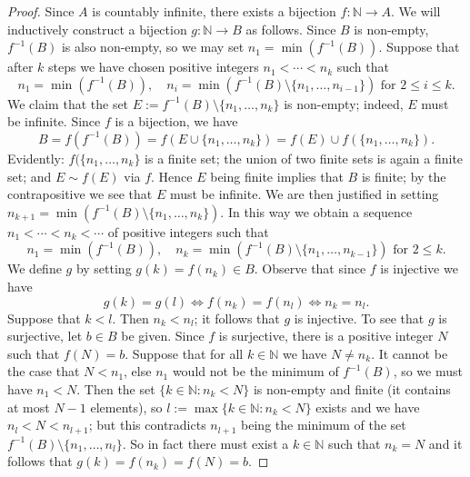 \documentclass[12pt]{article}
\theoremstyle{definition}
\begin{document}
\begin{proof}
    Since \( A \) is countably infinite, there exists a bijection \( f : \mathbb{N} \to A \). We will inductively construct a bijection \( g : \mathbb{N} \to B \) as follows. Since \( B \) is non-empty, \( f^{-1}(B) \) is also non-empty, so we may set \( n_1 = \min( f^{-1}(B)) \). Suppose that after \( k \) steps we have chosen positive integers \( n_1 < \cdots < n_k \) such that
    \[
        n_1 = \min(f^{-1}(B)), \quad n_i = \min(f^{-1}(B) \setminus \{ n_1, \ldots, n_{i-1} \}) \text{ for } 2 \leq i \leq k.
    \]
    We claim that the set \( E := f^{-1}(B) \setminus \{ n_1, \ldots, n_k \} \) is non-empty; indeed, \( E \) must be infinite. Since \( f \) is a bijection, we have
    \[
        B = f(f^{-1}(B)) = f(E \cup \{ n_1, \ldots, n_k \}) = f(E) \cup f(\{n_1, \ldots, n_k\}).
    \]
    Evidently: \( f(\{n_1, \ldots, n_k\} \) is a finite set; the union of two finite sets is again a finite set; and \( E \sim f(E) \) via \( f \). Hence \( E \) being finite implies that \( B \) is finite; by the contrapositive we see that \( E \) must be infinite. We are then justified in setting \( n_{k+1} = \min( f^{-1}(B) \setminus \{ n_1, \ldots, n_k \} ) \). In this way we obtain a sequence \( n_1 < \cdots < n_k < \cdots \) of positive integers such that
    \[
        n_1 = \min(f^{-1}(B)), \quad n_k = \min(f^{-1}(B) \setminus \{ n_1, \ldots, n_{k-1} \}) \text{ for } 2 \leq k.
    \]
    We define \( g \) by setting \( g(k) = f(n_k) \in B \). Observe that since \( f \) is injective we have
    \[
        g(k) = g(l) \iff f(n_k) = f(n_l) \iff n_k = n_l.
    \]
    Suppose that \( k < l \). Then \( n_k < n_l \); it follows that \( g \) is injective. To see that \( g \) is surjective, let \( b \in B \) be given. Since \( f \) is surjective, there is a positive integer \( N \) such that \( f(N) = b \). Suppose that for all \( k \in \mathbb{N} \) we have \( N \neq n_k \). It cannot be the case that \( N < n_1 \), else \( n_1 \) would not be the minimum of \( f^{-1}(B) \), so we must have \( n_1 < N \). Then the set \( \{ k \in \mathbb{N} : n_k < N \} \) is non-empty and finite (it contains at most \( N - 1 \) elements), so \( l := \max \{ k \in \mathbb{N} : n_k < N \} \) exists and we have \( n_l < N < n_{l+1} \); but this contradicts \( n_{l+1} \) being the minimum of the set \( f^{-1}(B) \setminus \{ n_1, \ldots, n_l \} \). So in fact there must exist a \( k \in \mathbb{N} \) such that \( n_k = N \) and it follows that \( g(k) = f(n_k) = f(N) = b \).
\end{proof}
\end{document}
